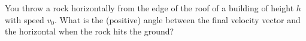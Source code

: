 You throw a rock horizontally from the edge of the roof of a building of height
$h$ with speed $v_0$.
What is the (positive) angle
between the final velocity vector and the horizontal when the rock
hits the ground?\answercheck
